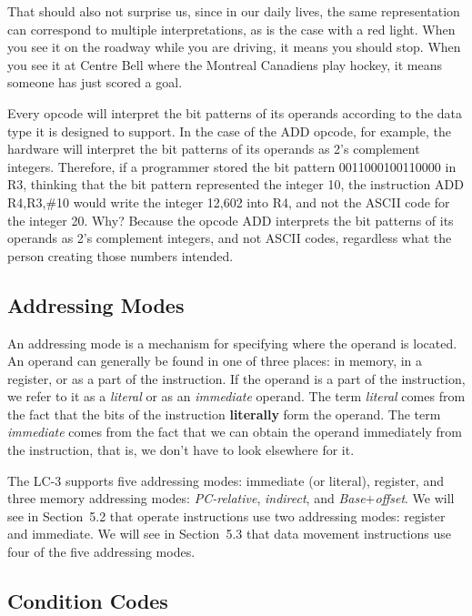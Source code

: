 \documentclass{patt}
\begin{document}
That should also not surprise us, since in our daily lives, the same 
representation can correspond to multiple interpretations, as is the case with
a red light.  When you see it on the roadway while you are driving, it 
means you should stop.  When you see it at Centre Bell where the Montreal
Canadiens play hockey, it means someone has just scored a goal.

Every opcode will interpret the bit patterns of its operands according to the
data type it is designed to support.  In the case of the ADD opcode, for
example, the hardware will interpret the bit patterns of its operands as 
2's complement integers.  Therefore, if a programmer stored the bit pattern 
0011000100110000 in R3, thinking that the bit pattern represented the integer 
10, the instruction ADD R4,R3,\#10 would write the integer 12,602 into R4, 
and not the ASCII code for the integer 20.  Why?  Because the opcode ADD 
interprets the bit patterns of its operands as 2's complement integers, and 
not ASCII codes, regardless what the person creating those numbers intended.

\subsection{Addressing Modes}\label{sec:addr_modes}

An addressing mode is a mechanism for specifying where
the operand is located. An operand can generally be found in one of
three places: in memory, in a register, or as a part of the
instruction. If the operand is a part of the instruction, we
refer to it as a {\em literal} or as an {\em immediate} operand.
The term {\em literal} comes from the fact that the bits of the
instruction {\bf literally} form the operand. The term {\em immediate}
comes from the fact that we can obtain the operand immediately from the 
instruction, that is, we don't have to look elsewhere for it.

The LC-3 supports five addressing modes: immediate (or literal),
register, and three memory addressing modes: {\em PC-relative},
{\em indirect}, and {\em Base$+$offset}.
We will see in Section~5.2 that operate instructions use two
addressing modes: register and immediate. We will see in
Section~5.3 that data movement instructions use four of the five 
addressing modes.

\subsection{Condition Codes}
\end{document}
